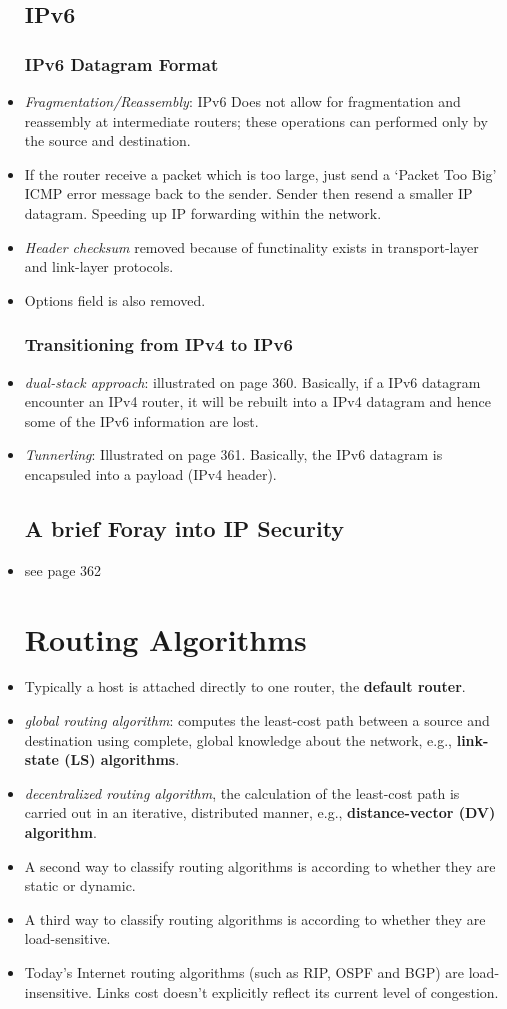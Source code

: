 \documentclass{article}
\begin{document}
\begin{itemize}
\subsection{IPv6}
\subsubsection{IPv6 Datagram Format}
\item \emph{Fragmentation/Reassembly}: IPv6 Does not allow for
  fragmentation and reassembly at intermediate routers; these
  operations can performed only by the source and destination.
\item If the router receive a packet which is too large, just send a
  `Packet Too Big' ICMP error message back to the sender. Sender then
  resend a smaller IP datagram. Speeding up IP forwarding within the
  network.
\item \emph{Header checksum} removed because of functinality exists in
  transport-layer and link-layer protocols.
\item Options field is also removed.
\subsubsection{Transitioning from IPv4 to IPv6}
\item \emph{dual-stack approach}: illustrated on page 360. Basically,
  if a IPv6 datagram encounter an IPv4 router, it will be rebuilt into
  a IPv4 datagram and hence some of the IPv6 information are lost.
\item \emph{Tunnerling}: Illustrated on page 361. Basically, the IPv6
  datagram is encapsuled into a payload (IPv4 header).
\subsection{A brief Foray into IP Security}
\item see page 362
\section{Routing Algorithms}
\item Typically a host is attached directly to one router, the
  \textbf{default router}.
\item \emph{global routing algorithm}: computes the least-cost path
  between a source and destination using complete, global knowledge
  about the network, e.g., \textbf{link-state (LS) algorithms}.
\item \emph{decentralized routing algorithm}, the calculation of the
  least-cost path is carried out in an iterative, distributed manner,
  e.g., \textbf{distance-vector (DV) algorithm}.
\item A second way to classify routing algorithms is according to
  whether they are static or dynamic.
\item A third way to classify routing algorithms is according to
  whether they are load-sensitive.
\item Today's Internet routing algorithms (such as RIP, OSPF and BGP)
  are load-insensitive. Links cost doesn't explicitly reflect its
  current level of congestion.

\end{itemize}
\end{document}
